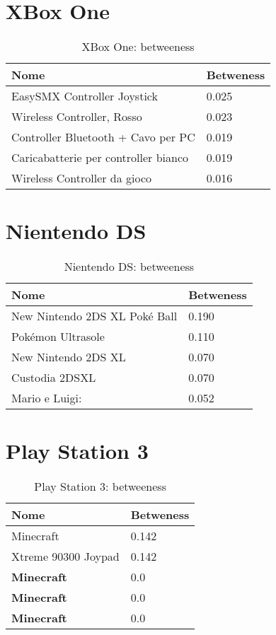 	
	\section{XBox One}
		\begin{table}[H]
			\caption{XBox One: betweeness}
			\label{tab:xbox}
			\centering
			\begin{tabular}{ll}
				\toprule 
				\textbf{Nome} & \textbf{Betweness} \\
				\midrule
				EasySMX Controller Joystick  & 0.025 \\
				Wireless Controller, Rosso  & 0.023 \\
				Controller Bluetooth + Cavo per PC  & 0.019 \\
				Caricabatterie per controller bianco & 0.019 \\
				Wireless Controller da gioco & 0.016 \\		
				\bottomrule
			\end{tabular}
		\end{table}
		
	\section{Nientendo DS}
		\begin{table}[H]
			\caption{Nientendo DS: betweeness}
			\label{tab:nientendoDS}
			\centering
			\begin{tabular}{ll}
				\toprule 
				\textbf{Nome} & \textbf{Betweness} \\
				\midrule
				New Nintendo 2DS XL Poké Ball  & 0.190 \\
				Pokémon Ultrasole  & 0.110 \\
				New Nintendo 2DS XL  & 0.070 \\
				Custodia 2DSXL & 0.070 \\
				Mario e Luigi: & 0.052 \\		
				\bottomrule
			\end{tabular}
		\end{table}
	
	\section{Play Station 3}
		\begin{table}[H]
			\caption{Play Station 3: betweeness}
			\label{tab:ps3}
			\centering
			\begin{tabular}{ll}
				\toprule 
				\textbf{Nome} & \textbf{Betweness} \\
				\midrule
				Minecraft & 0.142 \\
				Xtreme 90300 Joypad & 0.142 \\
				\textbf{Minecraft}  & 0.0 \\
				\textbf{Minecraft} & 0.0 \\
				\textbf{Minecraft} & 0.0 \\		
				\bottomrule
			\end{tabular}
		\end{table}
	
